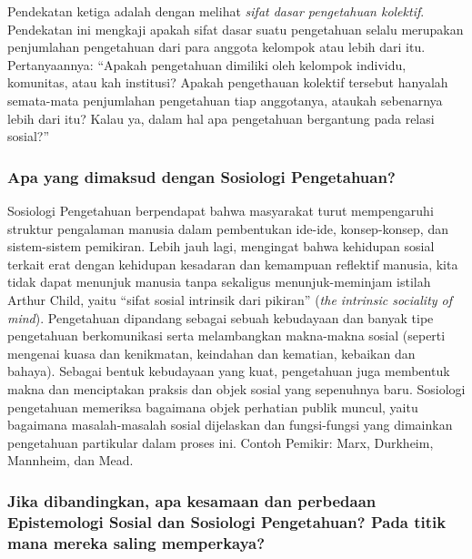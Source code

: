 \documentclass[11pt,twoside,a5paper,openany]{memoir}
\begin{document}
Pendekatan ketiga adalah dengan melihat \emph{sifat dasar pengetahuan
kolektif}. Pendekatan ini mengkaji apakah sifat dasar suatu pengetahuan
selalu merupakan penjumlahan pengetahuan dari para anggota kelompok atau
lebih dari itu. Pertanyaannya: ``Apakah pengetahuan dimiliki oleh
kelompok individu, komunitas, atau kah institusi? Apakah pengethauan
kolektif tersebut hanyalah semata-mata penjumlahan pengetahuan tiap
anggotanya, ataukah sebenarnya lebih dari itu? Kalau ya, dalam hal apa
pengetahuan bergantung pada relasi sosial?''

\hypertarget{apa-yang-dimaksud-dengan-sosiologi-pengetahuan}{%
\subsubsection{Apa yang dimaksud dengan Sosiologi
Pengetahuan?}\label{apa-yang-dimaksud-dengan-sosiologi-pengetahuan}}

Sosiologi Pengetahuan berpendapat bahwa masyarakat turut mempengaruhi
struktur pengalaman manusia dalam pembentukan ide-ide, konsep-konsep,
dan sistem-sistem pemikiran. Lebih jauh lagi, mengingat bahwa kehidupan
sosial terkait erat dengan kehidupan kesadaran dan kemampuan reflektif
manusia, kita tidak dapat menunjuk manusia tanpa sekaligus
menunjuk-meminjam istilah Arthur Child, yaitu ``sifat sosial intrinsik
dari pikiran'' (\emph{the intrinsic sociality of mind}). Pengetahuan
dipandang sebagai sebuah kebudayaan dan banyak tipe pengetahuan
berkomunikasi serta melambangkan makna-makna sosial (seperti mengenai
kuasa dan kenikmatan, keindahan dan kematian, kebaikan dan bahaya).
Sebagai bentuk kebudayaan yang kuat, pengetahuan juga membentuk makna
dan menciptakan praksis dan objek sosial yang sepenuhnya baru. Sosiologi
pengetahuan memeriksa bagaimana objek perhatian publik muncul, yaitu
bagaimana masalah-masalah sosial dijelaskan dan fungsi-fungsi yang
dimainkan pengetahuan partikular dalam proses ini. Contoh Pemikir: Marx,
Durkheim, Mannheim, dan Mead.

\hypertarget{jika-dibandingkan-apa-kesamaan-dan-perbedaan-epistemologi-sosial-dan-sosiologi-pengetahuan-pada-titik-mana-mereka-saling-memperkaya}{%
\subsubsection{Jika dibandingkan, apa kesamaan dan perbedaan
Epistemologi Sosial dan Sosiologi Pengetahuan? Pada titik mana mereka
saling
memperkaya?}\label{jika-dibandingkan-apa-kesamaan-dan-perbedaan-epistemologi-sosial-dan-sosiologi-pengetahuan-pada-titik-mana-mereka-saling-memperkaya}}
\end{document}
